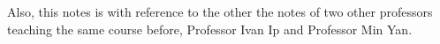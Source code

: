 \documentclass[
	11pt, %
	fleqn, %
	a4paper, %
]{LegrandOrangeBook}
\begin{document}
\noindent Also, this notes is with reference to the other the notes of two other professors teaching the same course before, Professor Ivan Ip and Professor Min Yan.



\pagestyle{empty} %

\tableofcontents %

\cleardoublepage %

\pagestyle{fancy} %

\newpage


\vspace{8pt}
\end{document}
